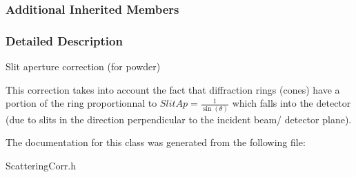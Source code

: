 \subsubsection*{Additional Inherited Members}


\subsubsection{Detailed Description}
Slit aperture correction (for powder) 

This correction takes into account the fact that diffraction rings (cones) have a portion of the ring proportionnal to $ SlitAp = \frac{1}{\sin(\theta)} $ which falls into the detector (due to slits in the direction perpendicular to the incident beam/ detector plane). 

The documentation for this class was generated from the following file\+:\begin{DoxyCompactItemize}
\item 
Scattering\+Corr.\+h\end{DoxyCompactItemize}
